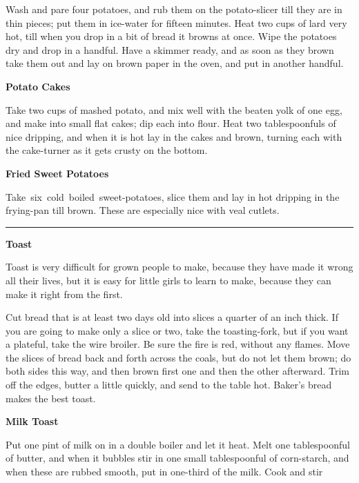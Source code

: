 \documentclass[11pt]{book}
\newcommand{\hstroke}{\rule[0.5ex]{5.0em}{0.2ex}}
\newcommand{\indpar}{\par\noindent\hspace*{\parindent}}
\newcommand{\instruction}{\indpar}
\newenvironment{RecipeTitle}{\medskip\begin{center}\large\bf }{\end{center}\smallskip}
\begin{document}
\instruction
  Wash and pare four potatoes, and rub them on the potato-slicer
till they are in thin pieces; put them in ice-water for fifteen
minutes.  Heat two cups of lard very hot, till when you drop in
a bit of bread it browns at once.  Wipe the potatoes dry and drop
in a handful.  Have a skimmer ready, and as soon as they brown
take them out and lay on brown paper in the oven, and put in
another handful.
\begin{RecipeTitle}
Potato Cakes\label{potato_cakes}
\end{RecipeTitle}
\instruction
  Take two cups of mashed potato, and mix well with the beaten
yolk of one egg, and make into small flat cakes;  dip each into
flour.  Heat two tablespoonfuls of nice dripping, and when
it is hot lay in the cakes and brown, turning each with the
cake-turner as it gets crusty on the bottom.\pagebreak[4]
\begin{RecipeTitle}
Fried Sweet Potatoes\label{fried_sweet_potatoes}
\end{RecipeTitle}
\instruction
  Take\, six\, cold\, boiled\, sweet-potatoes, slice them and lay in hot
dripping in the frying-pan till brown.  These are especially nice
with veal cutlets.
\bigskip
\begin{center}
\hstroke
\end{center}
\begin{RecipeTitle}
Toast\label{toast}
\end{RecipeTitle}
\instruction
  Toast is very difficult for grown people to make, because they
have made it wrong all their lives, but it is easy for little
girls to learn to make, because they can make it right from the
first.
\indpar
  Cut bread that is at least two days old into slices a quarter
of an inch thick.  If you are going to make only a slice or two,
take the toasting-fork, but if you want a plateful, take the wire
broiler.  Be sure the fire is red, without any flames.  Move the
slices of bread back and forth across the coals, but do not let
them brown; do both sides this way, and then brown first one and
then the other afterward.  Trim off the edges, butter a little
quickly, and send to the table hot.  Baker's bread makes the
best toast.
\begin{RecipeTitle}
Milk Toast\label{milk_toast}
\end{RecipeTitle}
\instruction
  Put one pint of milk on in a double boiler and let it heat.
Melt one tablespoonful of butter, and when it bubbles stir in
one small tablespoonful of corn-starch, and when these are
rubbed smooth, put in one-third of the milk.  Cook and stir
\end{document}
